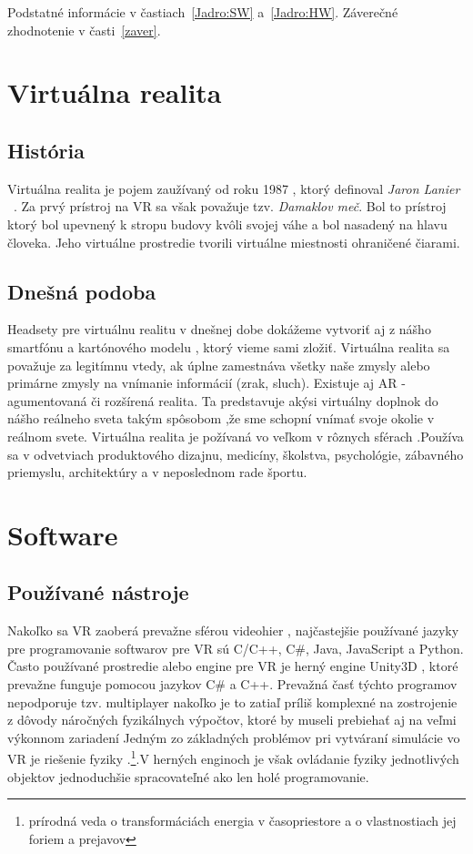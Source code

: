 \documentclass[10pt,twoside,slovak,a4paper]{article}										%
\begin{document}
Podstatné informácie v častiach~\ref{Jadro:SW} a~\ref{Jadro:HW}.
Záverečné zhodnotenie v časti~\ref{zaver}.


\section{Virtuálna realita}	\label{VR}
\subsection{História} \label{VR:hist}		
Virtuálna realita je pojem zaužívaný od roku 1987 , ktorý definoval \emph{Jaron Lanier} ~\cite{Jaron:zdroj}. Za prvý prístroj na VR sa však považuje tzv. \emph{Damaklov meč}. Bol to prístroj ktorý bol upevnený k stropu budovy kvôli svojej váhe a bol nasadený na hlavu človeka. Jeho virtuálne prostredie tvorili virtuálne miestnosti ohraničené čiarami.

\subsection {Dnešná podoba} \label{VR:now}
 Headsety pre virtuálnu realitu v dnešnej dobe dokážeme vytvoriť aj z nášho smartfónu a kartónového modelu , ktorý vieme sami zložiť. Virtuálna realita sa považuje za legitímnu vtedy, ak úplne zamestnáva všetky naše zmysly alebo primárne zmysly na vnímanie informácií (zrak, sluch). Existuje aj AR - agumentovaná či rozšírená realita. Ta predstavuje akýsi virtuálny doplnok do nášho reálneho sveta takým spôsobom ,že sme schopní vnímať svoje okolie v reálnom svete. Virtuálna realita je požívaná vo veľkom v rôznych sférach .Používa sa v odvetviach produktového dizajnu, medicíny, školstva, psychológie, zábavného priemyslu, architektúry a v neposlednom rade športu.


\section{Software} \label{SW}
\subsection{Používané nástroje} \label{SW:tools}
Nakoľko sa VR zaoberá prevažne sférou videohier , najčastejšie používané jazyky pre programovanie softwarov pre VR sú C/C++, C\#, Java, JavaScript a Python. Často používané prostredie alebo engine pre VR je herný engine Unity3D , ktoré prevažne funguje pomocou jazykov C\# a C++. Prevažná časť týchto programov nepodporuje tzv. multiplayer nakoľko je to zatiaľ príliš komplexné na zostrojenie z dôvody náročných fyzikálnych výpočtov, ktoré by museli prebiehať aj na veľmi výkonnom zariadení 
Jedným zo základných problémov pri vytváraní simulácie vo VR je riešenie fyziky .\footnote{ prírodná veda o transformáciách energia v časopriestore a o vlastnostiach jej foriem a prejavov}.V herných enginoch je však ovládanie fyziky jednotlivých objektov jednoduchšie spracovateľné ako len holé programovanie.
\end{document}
